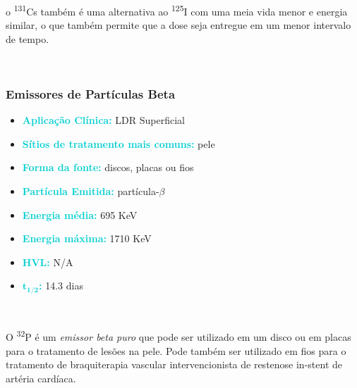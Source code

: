 \documentclass[11pt,a4paper]{article}
\begin{document}
			o \textsuperscript{131}Cs também é uma alternativa ao \textsuperscript{125}I com uma meia vida menor e energia similar, o que também permite que a dose seja entregue em um menor intervalo de tempo.

			\

\subsubsection*{Emissores de Partículas Beta}

		\begin{tcolorbox}[width=\textwidth, colback={white}, colbacktitle={DarkTurquoise!50!white}, title={$\bigstar$ \LobsterTwo{Fósforo 32} $\bigstar$}, coltitle={CarnationPink}, colframe={DarkTurquoise}, fonttitle=\rmfamily\bfseries\Large, breakable]	
			\begin{itemize}
				\item \textcolor{DarkTurquoise}{\textbf{Aplicação Clínica:}} LDR Superficial
				\item \textcolor{DarkTurquoise}{\textbf{Sítios de tratamento mais comuns:}} pele
				\item \textcolor{DarkTurquoise}{\textbf{Forma da fonte:}} discos, placas ou fios
				\item \textcolor{DarkTurquoise}{\textbf{Partícula Emitida:}} partícula-$\beta$
				\item \textcolor{DarkTurquoise}{\textbf{Energia média:}} 695 KeV
				\item \textcolor{DarkTurquoise}{\textbf{Energia máxima:}} 1710 KeV
				\item \textcolor{DarkTurquoise}{\textbf{HVL:}} N/A
				\item \textcolor{DarkTurquoise}{\textbf{$\mathbf{t_{1/2}}$:}} 14.3 dias
			\end{itemize}
		\end{tcolorbox}

			\

			O \textsuperscript{32}P é um \textit{\textcolor{CarnationPink}{emissor beta puro}} que pode ser utilizado em um disco ou em placas para o tratamento de lesões na pele. Pode também ser utilizado em fios para o tratamento de braquiterapia vascular intervencionista de restenose in-stent de artéria cardíaca.

			\
\end{document}
